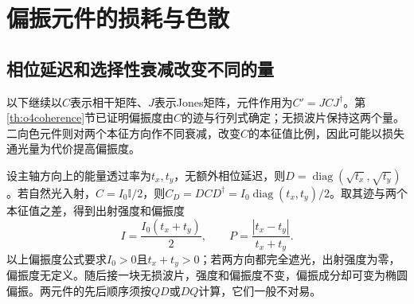 \section{偏振元件的损耗与色散}
\subsection{相位延迟和选择性衰减改变不同的量}
以下继续以$C$表示相干矩阵、$J$表示Jones矩阵，元件作用为$C'=JCJ^\dagger$。第\ref{th:o4coherence}节已证明偏振度由$C$的迹与行列式确定；无损波片保持这两个量。二向色元件则对两个本征方向作不同衰减，改变$C$的本征值比例，因此可能以损失通光量为代价提高偏振度。

设主轴方向上的能量透过率为$t_x,t_y$，无额外相位延迟，则$D=\operatorname{diag}(\sqrt{t_x},\sqrt{t_y})$。若自然光入射，$C=I_0\mathbb I/2$，则$C_D=DCD^\dagger=I_0\operatorname{diag}(t_x,t_y)/2$。取其迹与两个本征值之差，得到出射强度和偏振度
\[
 I=\frac{I_0(t_x+t_y)}2,\qquad
 P=\frac{|t_x-t_y|}{t_x+t_y}.
\]
以上偏振度公式要求$I_0>0$且$t_x+t_y>0$；若两方向都完全遮光，出射强度为零，偏振度无定义。随后接一块无损波片，强度和偏振度不变，偏振成分却可变为椭圆偏振。两元件的先后顺序须按$QD$或$DQ$计算，它们一般不对易。

